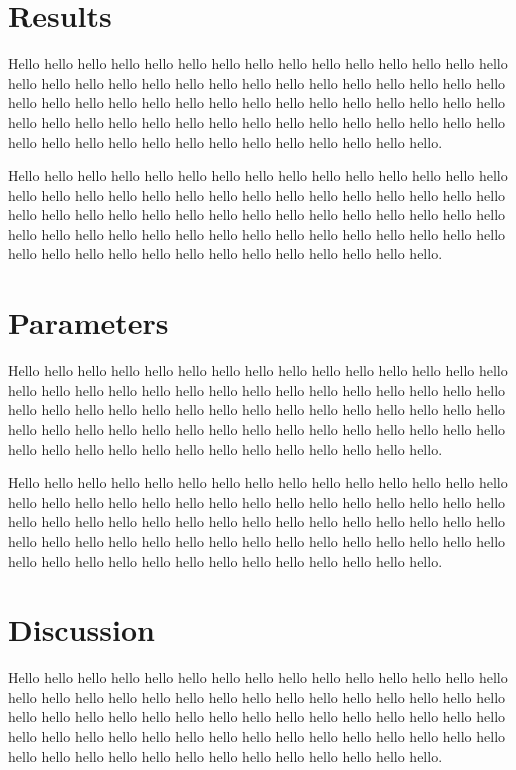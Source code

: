 \documentclass[12pt]{article} %
\begin{document}
\section*{Results}
Hello hello hello hello hello hello hello hello hello hello hello hello hello hello hello hello hello hello hello hello hello hello hello hello hello hello hello hello hello hello hello hello hello hello hello hello hello hello hello hello hello hello hello hello hello hello hello hello hello hello hello hello hello hello hello hello hello hello hello hello hello hello hello hello hello hello hello hello hello hello hello hello hello.

Hello hello hello hello hello hello hello hello hello hello hello hello hello hello hello hello hello hello hello hello hello hello hello hello hello hello hello hello hello hello hello hello hello hello hello hello hello hello hello hello hello hello hello hello hello hello hello hello hello hello hello hello hello hello hello hello hello hello hello hello hello hello hello hello hello hello hello hello hello hello hello hello hello.

\section*{Parameters}
Hello hello hello hello hello hello hello hello hello hello hello hello hello hello hello hello hello hello hello hello hello hello hello hello hello hello hello hello hello hello hello hello hello hello hello hello hello hello hello hello hello hello hello hello hello hello hello hello hello hello hello hello hello hello hello hello hello hello hello hello hello hello hello hello hello hello hello hello hello hello hello hello hello.

Hello hello hello hello hello hello hello hello hello hello hello hello hello hello hello hello hello hello hello hello hello hello hello hello hello hello hello hello hello hello hello hello hello hello hello hello hello hello hello hello hello hello hello hello hello hello hello hello hello hello hello hello hello hello hello hello hello hello hello hello hello hello hello hello hello hello hello hello hello hello hello hello hello.

\section*{Discussion}
Hello hello hello hello hello hello hello hello hello hello hello hello hello hello hello hello hello hello hello hello hello hello hello hello hello hello hello hello hello hello hello hello hello hello hello hello hello hello hello hello hello hello hello hello hello hello hello hello hello hello hello hello hello hello hello hello hello hello hello hello hello hello hello hello hello hello hello hello hello hello hello hello hello.
\end{document}
